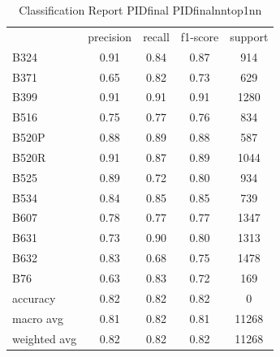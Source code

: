 \begin{table}[htbp]
\centering
\caption{Classification Report PIDfinal PIDfinalnntop1nn}
\label{tab:classificationreport.PIDfinal.PIDfinalnntop1nn}
\begin{tabular}{lcccc}
 & precision & recall & f1-score & support \\
B324 & 0.91 & 0.84 & 0.87 & 914 \\
B371 & 0.65 & 0.82 & 0.73 & 629 \\
B399 & 0.91 & 0.91 & 0.91 & 1280 \\
B516 & 0.75 & 0.77 & 0.76 & 834 \\
B520P & 0.88 & 0.89 & 0.88 & 587 \\
B520R & 0.91 & 0.87 & 0.89 & 1044 \\
B525 & 0.89 & 0.72 & 0.80 & 934 \\
B534 & 0.84 & 0.85 & 0.85 & 739 \\
B607 & 0.78 & 0.77 & 0.77 & 1347 \\
B631 & 0.73 & 0.90 & 0.80 & 1313 \\
B632 & 0.83 & 0.68 & 0.75 & 1478 \\
B76 & 0.63 & 0.83 & 0.72 & 169 \\
accuracy & 0.82 & 0.82 & 0.82 & 0 \\
macro avg & 0.81 & 0.82 & 0.81 & 11268 \\
weighted avg & 0.82 & 0.82 & 0.82 & 11268 \\
\end{tabular}
\end{table}
